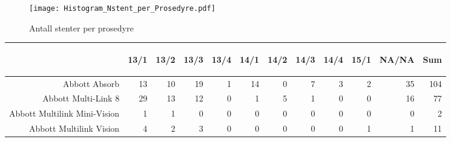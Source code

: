 \documentclass[presentation,xcolor=pdftex,dvipsnames,table]{beamer}
\begin{document}
\begin{frame}
\begin{figure}
  \centering
  \caption{Antall stenter per prosedyre}
  

\texttt{[image: Histogram\_Nstent\_per\_Prosedyre.pdf]}
\end{figure}
\end{frame}




\begin{frame}
\begin{tiny}
\begin{table}[ht]
\centering
\begin{tabular}{rrrrrrrrrrrr}
  \toprule
 & \begin{sideways} 13/1 \end{sideways} & \begin{sideways} 13/2 \end{sideways} & \begin{sideways} 13/3 \end{sideways} & \begin{sideways} 13/4 \end{sideways} & \begin{sideways} 14/1 \end{sideways} & \begin{sideways} 14/2 \end{sideways} & \begin{sideways} 14/3 \end{sideways} & \begin{sideways} 14/4 \end{sideways} & \begin{sideways} 15/1 \end{sideways} & \begin{sideways} NA/NA \end{sideways} & \begin{sideways} Sum \end{sideways} \\ 
  \midrule
Abbott Absorb & 13 & 10 & 19 & 1 & 14 & 0 & 7 & 3 & 2 & 35 & 104 \\ 
  Abbott Multi-Link 8 & 29 & 13 & 12 & 0 & 1 & 5 & 1 & 0 & 0 & 16 & 77 \\ 
  Abbott Multilink Mini-Vision & 1 & 1 & 0 & 0 & 0 & 0 & 0 & 0 & 0 & 0 & 2 \\ 
  Abbott Multilink Vision & 4 & 2 & 3 & 0 & 0 & 0 & 0 & 0 & 1 & 1 & 11 \\ 

\end{tabular}
\end{table}
\end{tiny}
\end{frame}
\end{document}
